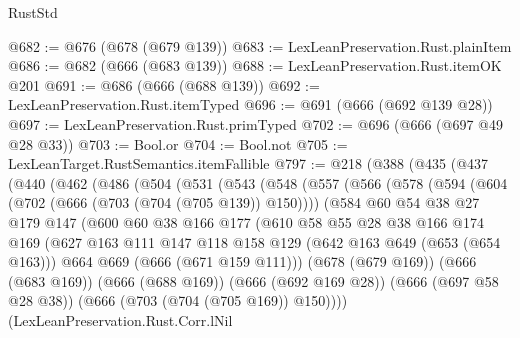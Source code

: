 \begin{lexlean}{RustStd}
\begin{coremodule}
@682 := @676 (@678 (@679 @139))
@683 := LexLeanPreservation.Rust.plainItem
@686 := @682 (@666 (@683 @139))
@688 := LexLeanPreservation.Rust.itemOK @201
@691 := @686 (@666 (@688 @139))
@692 := LexLeanPreservation.Rust.itemTyped
@696 := @691 (@666 (@692 @139 @28))
@697 := LexLeanPreservation.Rust.primTyped
@702 := @696 (@666 (@697 @49 @28 @33))
@703 := Bool.or
@704 := Bool.not
@705 := LexLeanTarget.RustSemantics.itemFallible
@797 := @218
    (@388
      (@435
        (@437
          (@440
            (@462
              (@486
                (@504
                  (@531
                    (@543
                      (@548
                        (@557
                          (@566
                            (@578
                              (@594
                                (@604 (@702 (@666 (@703 (@704 (@705 @139)) @150))))
                                (@584
                                  @60
                                  @54
                                  @38
                                  @27
                                  @179
                                  @147
                                  (@600
                                    @60
                                    @38
                                    @166
                                    @177
                                    (@610
                                      @58
                                      @55
                                      @28
                                      @38
                                      @166
                                      @174
                                      @169
                                      (@627
                                        @163
                                        @111
                                        @147
                                        @118
                                        @158
                                        @129
                                        (@642 @163 @649 (@653 (@654 @163)))
                                        @664
                                        @669
                                        (@666 (@671 @159 @111)))
                                      (@678 (@679 @169))
                                      (@666 (@683 @169))
                                      (@666 (@688 @169))
                                      (@666 (@692 @169 @28))
                                      (@666 (@697 @58 @28 @38))
                                      (@666 (@703 (@704 (@705 @169)) @150))))
                                  (LexLeanPreservation.Rust.Corr.lNil

\end{coremodule}
\end{lexlean}
